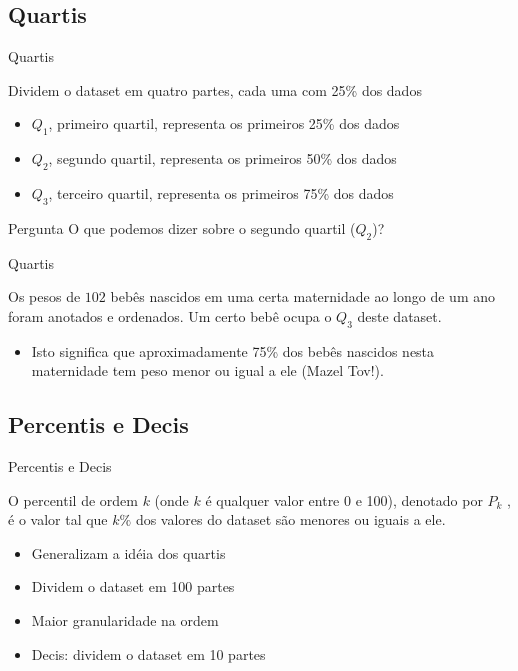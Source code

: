 \documentclass{beamer}
\begin{document}
\subsection{Quartis}
\begin{frame}{Quartis}
  \begin{definition}
    Dividem o dataset em quatro partes, cada uma com 25\% dos dados
  \end{definition}
  \begin{itemize}
  \item $Q_1$, primeiro quartil, representa os primeiros 25\% dos dados
  \item $Q_2$, segundo quartil, representa os primeiros 50\% dos dados
  \item $Q_3$, terceiro quartil, representa os primeiros 75\% dos dados
  \end{itemize}
  \begin{block}{Pergunta}
    O que podemos dizer sobre o segundo quartil ($Q_2$)?    
  \end{block}
\end{frame}

\begin{frame}{Quartis}
  \begin{example}
    Os pesos de $102$ bebês nascidos em uma certa maternidade ao longo
    de um ano foram anotados e ordenados. Um certo bebê ocupa o $Q_3$
    deste dataset.

    \begin{itemize}
    \item Isto significa que aproximadamente 75\% dos bebês nascidos nesta
    maternidade tem peso menor ou igual a ele (Mazel Tov!).
  \end{itemize}
\end{example}
\end{frame}

\subsection{Percentis e Decis}
\begin{frame}{Percentis e Decis}
  \begin{definition}
    O percentil de ordem $k$ (onde $k$ é qualquer valor entre 0 e
    100), denotado por $P_k$ , é o valor tal que $k\%$ dos valores do
    dataset são menores ou iguais a ele.
  \end{definition}

  \begin{itemize}
  \item Generalizam a idéia dos quartis
  \item Dividem o dataset em 100 partes
  \item Maior granularidade na ordem
  \item \alert{Decis}: dividem o dataset em 10 partes
  \end{itemize}
\end{frame}
\end{document}
